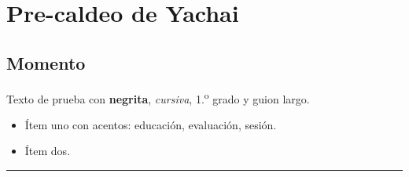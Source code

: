 \documentclass[11pt,a4paper]{article}
\begin{document}
\section*{Pre-caldeo de Yachai}
\subsection*{Momento}
Texto de prueba con \textbf{negrita}, \textit{cursiva}, 1.\textsuperscript{o} grado y guion \textemdash{} largo.
\begin{itemize}
  \item Ítem uno con acentos: educación, evaluación, sesión.
  \item Ítem dos.
\end{itemize}
\hrule
\end{document}

